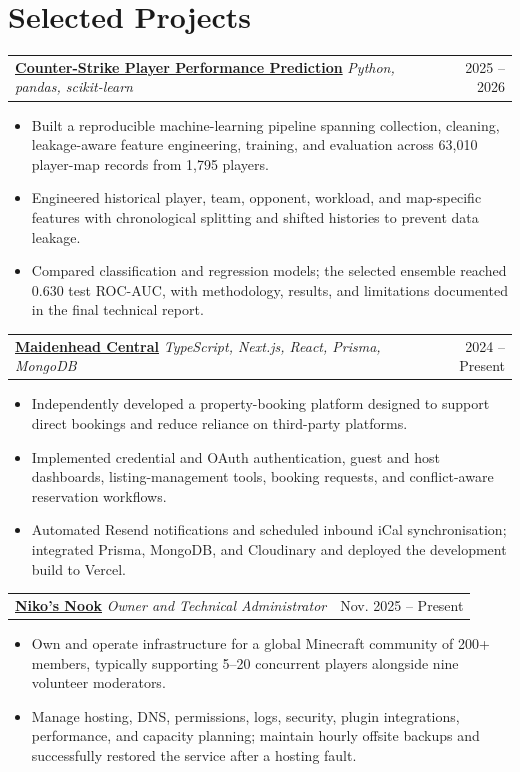 \documentclass[a4paper,10pt]{article}
\makeatletter
\newcommand{\project}[2]{%
  \begin{tabular*}{\textwidth}{@{}l@{\extracolsep{\fill}}r@{}}
    #1 & #2
  \end{tabular*}\vspace{-1pt}
}
\newenvironment{cvitems}
  {\begin{itemize}[leftmargin=1.25em,itemsep=1.5pt,topsep=2pt,parsep=0pt,partopsep=0pt]}
  {\end{itemize}\vspace{2pt}}
\makeatother
\begin{document}
\section{Selected Projects}
\project{\textbf{\href{https://gabrieldorosh.com/projects/predictive-analysis/}{Counter-Strike Player Performance Prediction}}
  \textbar{} \emph{Python, pandas, scikit-learn}}{2025 -- 2026}
\begin{cvitems}
  \item Built a reproducible machine-learning pipeline spanning collection,
    cleaning, leakage-aware feature engineering, training, and evaluation across
    63,010 player-map records from 1,795 players.
  \item Engineered historical player, team, opponent, workload, and map-specific
    features with chronological splitting and shifted histories to prevent data
    leakage.
  \item Compared classification and regression models; the selected ensemble
    reached 0.630 test ROC-AUC, with methodology, results, and limitations
    documented in the final technical report.
\end{cvitems}

\project{\textbf{\href{https://gabrieldorosh.com/projects/maidenhead-central/}{Maidenhead Central}}
  \textbar{} \emph{TypeScript, Next.js, React, Prisma, MongoDB}}{2024 -- Present}
\begin{cvitems}
  \item Independently developed a property-booking platform designed to support
    direct bookings and reduce reliance on third-party platforms.
  \item Implemented credential and OAuth authentication, guest and host dashboards,
    listing-management tools, booking requests, and conflict-aware reservation
    workflows.
  \item Automated Resend notifications and scheduled inbound iCal synchronisation;
    integrated Prisma, MongoDB, and Cloudinary and deployed the development build
    to Vercel.
\end{cvitems}

\project{\textbf{\href{https://gabrieldorosh.com/projects/nikos-nook/}{Niko's Nook}}
  \textbar{} \emph{Owner and Technical Administrator}}{Nov. 2025 -- Present}
\begin{cvitems}
  \item Own and operate infrastructure for a global Minecraft community of 200+
    members, typically supporting 5--20 concurrent players alongside nine volunteer
    moderators.
  \item Manage hosting, DNS, permissions, logs, security, plugin integrations,
    performance, and capacity planning; maintain hourly offsite backups and
    successfully restored the service after a hosting fault.
\end{cvitems}
\end{document}
